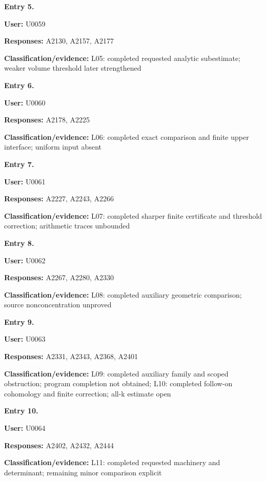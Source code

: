 \documentclass[10pt,a4paper,oneside]{report}
\begin{document}
\textbf{Entry 5.}

\textbf{User:} U0059

\textbf{Responses:} A2130, A2157, A2177

\textbf{Classification/evidence:} L05: completed requested analytic
subestimate; weaker volume threshold later strengthened


\textbf{Entry 6.}

\textbf{User:} U0060

\textbf{Responses:} A2178, A2225

\textbf{Classification/evidence:} L06: completed exact comparison and
finite upper interface; uniform input absent


\textbf{Entry 7.}

\textbf{User:} U0061

\textbf{Responses:} A2227, A2243, A2266

\textbf{Classification/evidence:} L07: completed sharper finite
certificate and threshold correction; arithmetic traces unbounded


\textbf{Entry 8.}

\textbf{User:} U0062

\textbf{Responses:} A2267, A2280, A2330

\textbf{Classification/evidence:} L08: completed auxiliary geometric
comparison; source nonconcentration unproved


\textbf{Entry 9.}

\textbf{User:} U0063

\textbf{Responses:} A2331, A2343, A2368, A2401

\textbf{Classification/evidence:} L09: completed auxiliary family and
scoped obstruction; program completion not obtained; L10: completed
follow-on cohomology and finite correction; all-k estimate open


\textbf{Entry 10.}

\textbf{User:} U0064

\textbf{Responses:} A2402, A2432, A2444

\textbf{Classification/evidence:} L11: completed requested machinery and
determinant; remaining minor comparison explicit
\end{document}
